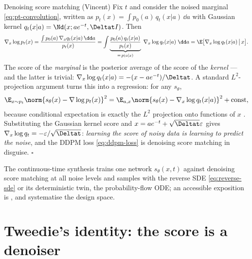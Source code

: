 \begin{toolbox}{Denoising score matching (Vincent)}
Fix $t$ and consider the noised marginal \eqref{eq:pt-convolution}, written
as $p_t(x) = \int p_0(a)\, q_t(x|a)\,\dd a$ with Gaussian kernel
$q_t(x|a) = \Nd(x; a e^{-t}, \Deltat I)$. Then
\begin{equation*}
  \nabla_x \log p_t(x)
  = \frac{\int p_0(a)\, \nabla_x q_t(x|a)\, \dd a}{p_t(x)}
  = \int \underbrace{\frac{p_0(a)\, q_t(x|a)}{p_t(x)}}_{=\,p(a|x)}\;
    \nabla_x \log q_t(x|a)\; \dd a
  = \E\big[ \nabla_x \log q_t(x|a) \,\big|\, x \big].
\end{equation*}
The score of the \emph{marginal} is the posterior average of the score of
the \emph{kernel} --- and the latter is trivial:
$\nabla_x \log q_t(x|a) = -(x - a e^{-t})/\Deltat$. A standard
$L^2$-projection argument turns this into a regression: for any
$s_\theta$,
\begin{equation*}
  \E_{x \sim p_t} \norm{ s_\theta(x) - \nabla \log p_t(x) }^2
  = \E_{a, x} \norm{ s_\theta(x) - \nabla_x \log q_t(x|a) }^2
  + \text{const},
\end{equation*}
because conditional expectation is exactly the $L^2$ projection onto
functions of $x$ \citep{vincent2011connection}. Substituting the Gaussian
kernel score and $x = a e^{-t} + \sqrt{\Deltat}\varepsilon$ gives
$\nabla_x \log q_t = -\varepsilon / \sqrt{\Deltat}$: \emph{learning the
score of noisy data is learning to predict the noise}, and the DDPM loss
\eqref{eq:ddpm-loss} is denoising score matching in disguise.
\hfill$\square$
\end{toolbox}

The continuous-time synthesis \citep{song2019generative, song2021scorebased}
trains one network $s_\theta(x, t)$ against denoising score matching at all
noise levels and samples with the reverse SDE \eqref{eq:reverse-sde} or its
deterministic twin, the probability-flow ODE; an accessible exposition is
\citet{song2021blog}, and \citet{karras2022elucidating} systematise the
design space.

\section{Tweedie's identity: the score is a denoiser}\label{sec:tweedie}

